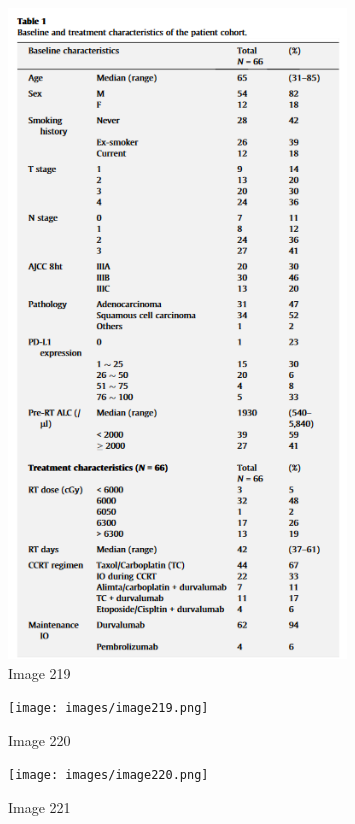 \documentclass{article}%
\begin{document}
\begin{figure}[h!]%
\centering%
\includegraphics[width=0.8\textwidth]{images/image218.png}%
\caption{Image 219}%
\end{figure}

%


\begin{figure}[h!]%
\centering%
\texttt{[image: images/image219.png]}%
\caption{Image 220}%
\end{figure}

%


\begin{figure}[h!]%
\centering%
\texttt{[image: images/image220.png]}%
\caption{Image 221}%
\end{figure}
\end{document}
